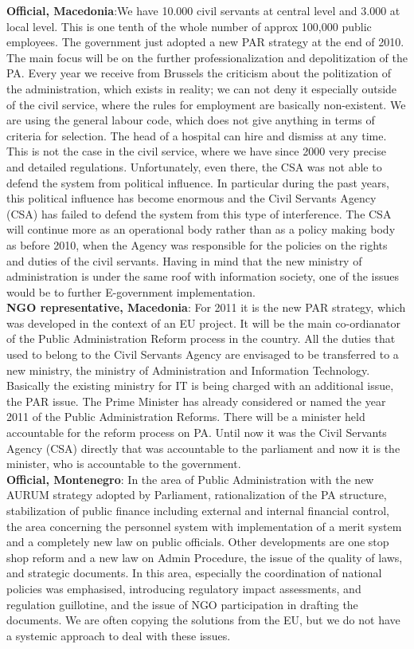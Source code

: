 \textbf{Official, Macedonia}:We have 10.000 civil servants at central level and 3.000 at local level. This is one tenth of the whole number of approx 100,000 public employees. The government just adopted a new PAR strategy at the end of 2010. The main focus will be on the further professionalization and depolitization of the PA. Every year we receive from Brussels the criticism about the politization of the administration, which exists in reality; we can not deny it especially outside of the civil service, where the rules for employment are basically non-existent. We are using the general labour code, which does not give anything in terms of criteria for selection. The head of a hospital can hire and dismiss at any time. This is not the case in the civil service, where we have since 2000 very precise and detailed regulations. Unfortunately, even there, the CSA was not able to defend the system from political influence. In particular during the past years, this political influence has become enormous and the Civil Servants Agency (CSA) has failed to defend the system from this type of interference. The CSA will continue more as an operational body rather than as a policy making body as before 2010, when the Agency was responsible for the policies on the rights and duties of the civil servants. Having in mind that the new ministry of administration is under the same roof with information society, one of the issues would be to further E-government implementation.\\
\textbf{NGO representative, Macedonia}: For 2011 it is the new PAR strategy, which was developed in the context of an EU project. It will be the main co-ordianator of the Public Administration Reform process in the country. All the duties that used to belong to the Civil Servants Agency are envisaged to be transferred to a new ministry, the ministry of Administration and Information Technology. Basically the existing ministry for IT is being charged with an additional issue, the PAR issue. The Prime Minister has already considered or named the year 2011 of the Public Administration Reforms. There will be a minister held accountable for the reform process on PA. Until now it was the Civil Servants Agency (CSA) directly that was accountable to the parliament and now it is the minister, who is accountable to the government.\\
\textbf{Official, Montenegro}: In the area of Public Administration with the new AURUM strategy adopted by Parliament, rationalization of the PA structure, stabilization of public finance including external and internal financial control, the area concerning the personnel system with implementation of a merit system and a completely new law on public officials. Other developments are one stop shop reform and a new law on Admin Procedure, the issue of the quality of laws, and strategic documents. In this area, especially the coordination of national policies was emphasised, introducing regulatory impact assessments, and regulation guillotine, and the issue of NGO participation in drafting the documents. We are often copying the solutions from the EU, but we do not have a systemic approach to deal with these issues.\\
